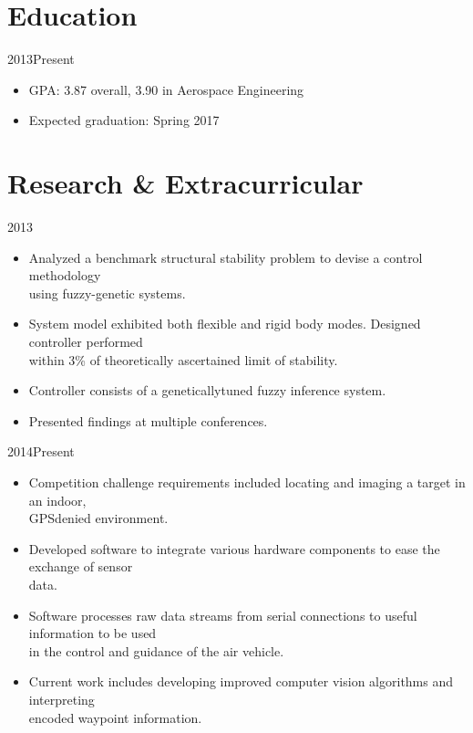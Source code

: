 \documentclass[letterpaper,10pt]{resume}
\author{Nicklas O. Stockton}
\begin{document}
	\maketitle
	\section{Education}
	{2013\textendash Present}
	
	\begin{itemize}
		\item GPA: 3.87 overall, 3.90 in Aerospace Engineering
		\item Expected graduation: Spring 2017
	\end{itemize}

	\section{Research \& Extracurricular}
	{2013}
	\begin{itemize}
		\item Analyzed a benchmark structural stability problem to devise a control methodology\\  using fuzzy-genetic systems.
		\item System model exhibited both flexible and rigid body modes. Designed controller performed\\ within 3\% of theoretically ascertained limit of stability.
		\item Controller consists of a genetically\textendash tuned fuzzy inference system.
		\item Presented findings at multiple conferences.
	\end{itemize}
	
	{2014\textendash Present}
	\begin{itemize}
		\item Competition challenge requirements included locating and imaging a target in an indoor,\\ GPS\textendash denied environment.
		\item Developed software to integrate various hardware components to ease the exchange of sensor\\ data.
		\item Software processes raw data streams from serial connections to useful information to be used\\ in the control and guidance of the air vehicle.
		\item Current work includes developing improved computer vision algorithms and interpreting\\ encoded waypoint information.
	\end{itemize}	
	\pagebreak
\end{document}
